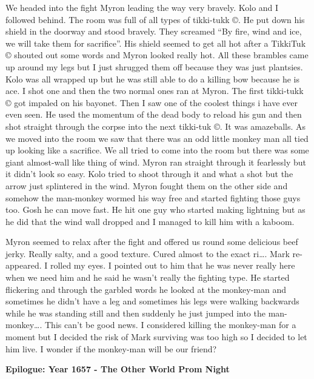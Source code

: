 We headed into the fight Myron leading the way very bravely. Kolo and I followed behind. The room was full of all types of tikki-tukk ©. He put down his shield in the doorway and stood bravely. They screamed “By fire, wind and ice, we will take them for sacrifice”. His shield seemed to get all hot after a TikkiTuk © shouted out some words and Myron looked really hot. All these brambles came up around my legs but I just shrugged them off because they was just plantsies. Kolo was all wrapped up but he was still able to do a killing bow because he is ace. I shot one and then the two normal ones ran at Myron. The first tikki-tukk © got impaled on his bayonet. Then I saw one of the coolest things i have ever even seen. He used the momentum of the dead body to reload his gun and then shot straight through the corpse into the next tikki-tuk ©. It was amazeballs. As we moved into the room we saw that there was an odd little monkey man all tied up looking like a sacrifice. We all tried to come into the room but there was some giant almost-wall like thing of wind. Myron ran straight through it fearlessly but it didn’t look so easy. Kolo tried to shoot through it and what a shot but the arrow just splintered in the wind. Myron fought them on the other side and somehow the man-monkey wormed his way free and started fighting those guys too. Gosh he can move fast. He hit one guy who started making lightning but as he did that the wind wall dropped and I managed to kill him with a kaboom.\medskip

Myron seemed to relax after the fight and offered us round some delicious beef jerky. Really salty, and a good texture. Cured almost to the exact ri…. Mark re-appeared. I rolled my eyes. I pointed out to him that he was never really here when we need him and he said he wasn’t really the fighting type. He started flickering and through the garbled words he looked at the monkey-man and sometimes he didn’t have a leg and sometimes his legs were walking backwards while he was standing still and then suddenly he just jumped into the man-monkey…. This can’t be good news. I considered killing the monkey-man for a moment but I decided the risk of Mark surviving was too high so I decided to let him live. I wonder if the monkey-man will be our friend?\medskip

\textbf{Epilogue: Year 1657 - The Other World Prom Night}\medskip


